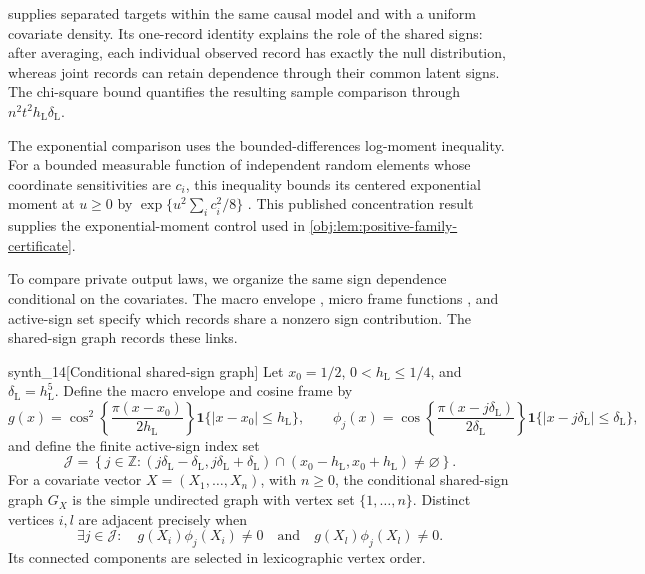 \documentclass[11pt]{article}
\begin{document}
 supplies separated targets within the same causal model and with a uniform covariate density. Its one-record identity explains the role of the shared signs: after averaging, each individual observed record has exactly the null distribution, whereas joint records can retain dependence through their common latent signs. The chi-square bound quantifies the resulting sample comparison through \(n^2t^2h_{\mathrm L}\delta_{\mathrm L}\).

The exponential comparison uses the bounded-differences log-moment inequality. For a bounded measurable function of independent random elements whose coordinate sensitivities are \(c_i\), this inequality bounds its centered exponential moment at \(u\ge0\) by \(\exp\{u^2\sum_i c_i^2/8\}\) \citep[Theorem 6.2, displayed log-mgf conclusion in its proof, p.~167]{BoucheronLugosiMassart2013}. This published concentration result supplies the exponential-moment control used in \cref{obj:lem:positive-family-certificate}.

To compare private output laws, we organize the same sign dependence conditional on the covariates. The macro envelope , micro frame functions , and active-sign set  specify which records share a nonzero sign contribution. The shared-sign graph  records these links.

\begin{definitionv}{synth_14}[Conditional shared-sign graph]
Let \(x_0=1/2\), \(0<h_{\mathrm L}\le1/4\), and \(\delta_{\mathrm L}=h_{\mathrm L}^5\). Define the macro envelope and cosine frame by
\[
g(x)=\cos^2\!\left\{\frac{\pi(x-x_0)}{2h_{\mathrm L}}\right\}
\mathbf1\{|x-x_0|\le h_{\mathrm L}\},
\qquad
\phi_j(x)=\cos\!\left\{\frac{\pi(x-j\delta_{\mathrm L})}{2\delta_{\mathrm L}}\right\}
\mathbf1\{|x-j\delta_{\mathrm L}|\le\delta_{\mathrm L}\},
\]
and define the finite active-sign index set
\[
\mathcal J=
\left\{j\in\mathbb Z:
(j\delta_{\mathrm L}-\delta_{\mathrm L},j\delta_{\mathrm L}+\delta_{\mathrm L})
\cap(x_0-h_{\mathrm L},x_0+h_{\mathrm L})\ne\varnothing
\right\}.
\]
For a covariate vector \(X=(X_1,\ldots,X_n)\), with \(n\ge0\), the conditional shared-sign graph \(G_X\) is the simple undirected graph with vertex set \(\{1,\ldots,n\}\). Distinct vertices \(i,l\) are adjacent precisely when
\[
\exists j\in\mathcal J:\quad
g(X_i)\phi_j(X_i)\ne0
\quad\text{and}\quad
g(X_l)\phi_j(X_l)\ne0.
\]
Its connected components are selected in lexicographic vertex order.
\end{definitionv}
\end{document}
